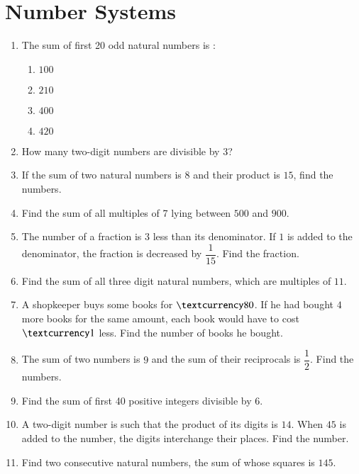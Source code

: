 \documentclass[journal,12pt,onecolumn]{IEEEtran}
\theoremstyle{remark}
\begin{document}
\section{Number Systems}
\begin{enumerate}
\item The sum of first 20 odd natural numbers is :\\
\begin{enumerate}
\item $100$\\
\item $210$\\
\item $400$\\
\item $420$\\
\end{enumerate}
\item How many two-digit numbers are divisible by 3?\\
\item If the sum of two natural numbers is $8$ and their product is $15$, find the numbers.\\
\item Find the sum of all multiples of 7 lying between $500$ and $900$.\\
\item The number of a fraction is $3$ less than its denominator. If $1$ is added to the denominator, the fraction is decreased by $\dfrac{1}{15}$. Find the fraction.\\

\item Find the sum of all three digit natural numbers, which are multiples of $11$.\\
\item A shopkeeper buys some books for $\textcurrency 80$. If he had bought $4$ more books for the same amount, each book would have to cost $\textcurrency 1$ less. Find the number of books he bought.\\

\item The sum of two numbers is $9$ and the sum of their reciprocals is $\dfrac{1}{2}$. Find the numbers.\\
\item Find the sum of first 40 positive integers divisible by $6$.\\
\item A two-digit number is such that the product of its digits is $14$. When $45$ is added to the number, the digits interchange their places. Find the number.\\
\item Find two consecutive natural numbers, the sum of whose squares is $145$.\\
\end{enumerate}
\end{document}
